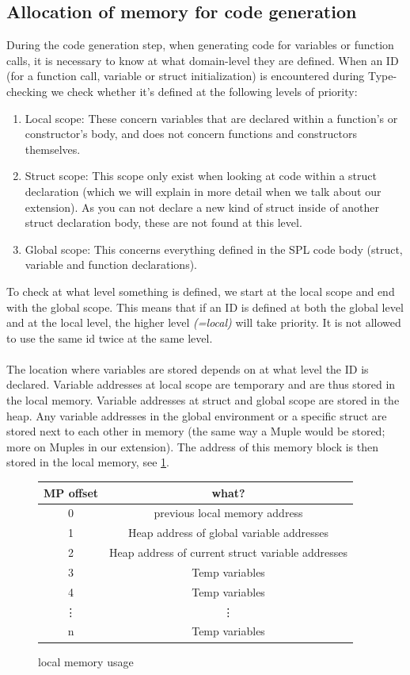 \documentclass[10pt,a4paper]{article}
\begin{document}
\subsection{Allocation of memory for code generation}
During the code generation step, when generating code for variables or function calls, it is necessary to know at what domain-level they are defined. When an ID (for a function call, variable or struct initialization) is encountered during Type-checking we check whether it's defined at the following levels of priority:
\begin{enumerate}
\item Local scope: These concern variables that are declared within a function's or constructor's body, and does not concern functions and constructors themselves.
\item Struct scope: This scope only exist when looking at code within a struct declaration (which we will explain in more detail when we talk about our extension). As you can not declare a new kind of struct inside of another struct declaration body, these are not found at this level.
\item Global scope: This concerns everything defined in the SPL code body (struct, variable and function declarations).
\end{enumerate}
To check at what level something is defined, we start at the local scope and end with the global scope. This means that if an ID is defined at both the global level and at the local level, the higher level \textit{(=local)} will take priority. It is not allowed to use the same id twice at the same level.\\
\\
The location where variables are stored depends on at what level the ID is declared. Variable addresses at local scope are temporary and are thus stored in the local memory. Variable addresses at struct and global scope are stored in the heap. Any variable addresses in the global environment or a specific struct are stored next to each other in memory (the same way a Muple would be stored; more on Muples in our extension). The address of this memory block is then stored in the local memory, see \ref{fig:linkmemory}.
\begin{figure}[h]
\centering
\begin{tabular}{c|c}
MP offset & what? \\\hline
0 & previous local memory address\\
1 & Heap address of global variable addresses\\
2 & Heap address of current struct variable addresses\\
3  & Temp variables\\
4 & Temp variables\\
\vdots & \vdots\\
n & Temp variables
\end{tabular}
\caption{local memory usage}
\label{fig:linkmemory}
\end{figure}
\end{document}
